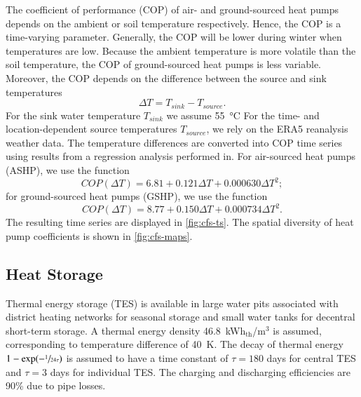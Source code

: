 The coefficient of performance (COP) of air- and ground-sourced heat pumps
depends on the ambient or soil temperature respectively. Hence, the COP is a
time-varying parameter. Generally, the COP will be lower during winter when
temperatures are low. Because the ambient temperature is more volatile than the
soil temperature, the COP of ground-sourced heat pumps is less variable.
Moreover, the COP depends on the difference between the source and sink
temperatures
\begin{equation}
    \Delta T = T_{sink} - T_{source}.
\end{equation}
For the sink water temperature $T_{sink}$ we assume \SI{55}{\celsius} For the
time- and location-dependent source temperatures $T_{source}$, we rely on the
ERA5 reanalysis weather data. The temperature differences are
converted into COP time series using results from a regression analysis
performed in. For air-sourced heat pumps
(ASHP), we use the function
\begin{equation}
    COP(\Delta T) = 6.81 + 0.121 \Delta T + 0.000630 \Delta T^2;
\end{equation}
for ground-sourced heat pumps (GSHP), we use the function
\begin{equation}
    COP(\Delta T) = 8.77 + 0.150 \Delta T + 0.000734 \Delta T^2.
\end{equation}
The resulting time series are displayed in \cref{fig:cfs-ts}.
The spatial diversity of heat pump coefficients is shown in \cref{fig:cfs-maps}.

\subsection{Heat Storage}
\label{sec:si:heat:storage}

Thermal energy storage (TES) is available in large water pits associated with
district heating networks for seasonal storage and small water tanks for
decentral short-term storage. A thermal energy density
46.8~kWh$_{\text{th}}$/m$^3$ is assumed, corresponding to temperature difference
of \SI{40}{\kelvin}. The decay of thermal energy $1-\exp(-\sfrac{1}{24\tau})$ is
assumed to have a time constant of $\tau=180$ days for central TES and $\tau=3$
days for individual TES. The charging and discharging efficiencies are 90\% due
to pipe losses.